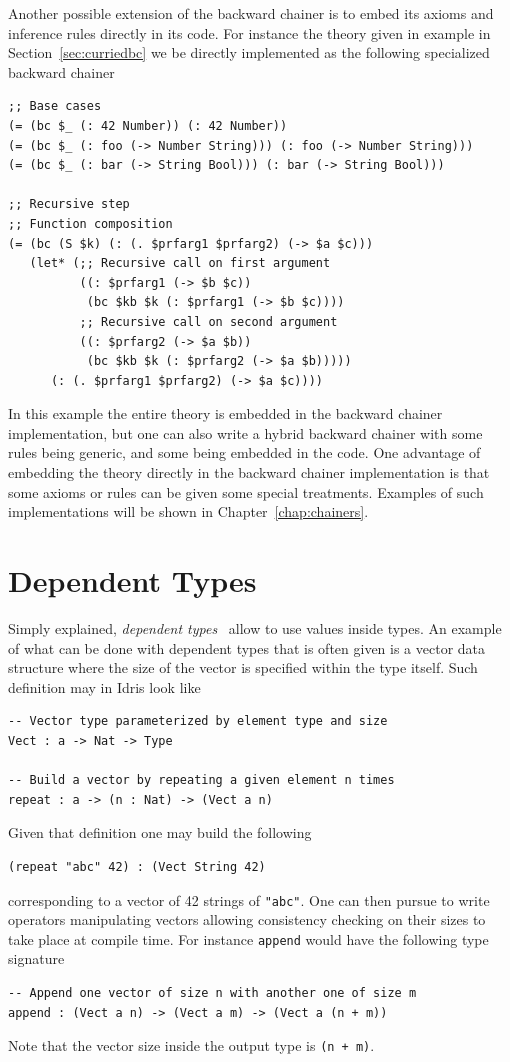 \documentclass[]{report}
\begin{document}
Another possible extension of the backward chainer is to embed its
axioms and inference rules directly in its code.  For instance the
theory given in example in Section~\ref{sec:curriedbc} we be directly
implemented as the following specialized backward chainer

\begin{verbatim}
;; Base cases
(= (bc $_ (: 42 Number)) (: 42 Number))
(= (bc $_ (: foo (-> Number String))) (: foo (-> Number String)))
(= (bc $_ (: bar (-> String Bool))) (: bar (-> String Bool)))

;; Recursive step
;; Function composition
(= (bc (S $k) (: (. $prfarg1 $prfarg2) (-> $a $c)))
   (let* (;; Recursive call on first argument
          ((: $prfarg1 (-> $b $c))
           (bc $kb $k (: $prfarg1 (-> $b $c))))
          ;; Recursive call on second argument
          ((: $prfarg2 (-> $a $b))
           (bc $kb $k (: $prfarg2 (-> $a $b)))))
      (: (. $prfarg1 $prfarg2) (-> $a $c))))
\end{verbatim}
In this example the entire theory is embedded in the backward chainer
implementation, but one can also write a hybrid backward chainer with
some rules being generic, and some being embedded in the code.  One
advantage of embedding the theory directly in the backward chainer
implementation is that some axioms or rules can be given some special
treatments.  Examples of such implementations will be shown in
Chapter~\ref{chap:chainers}.

\section{Dependent Types}

Simply explained, \emph{dependent types}~\cite{TODO} allow to use
values inside types.  An example of what can be done with dependent
types that is often given is a vector data structure where the size of
the vector is specified within the type itself.  Such definition may
in Idris look like
\begin{verbatim}
-- Vector type parameterized by element type and size
Vect : a -> Nat -> Type

-- Build a vector by repeating a given element n times
repeat : a -> (n : Nat) -> (Vect a n)
\end{verbatim}
Given that definition one may build the following
\begin{verbatim}
(repeat "abc" 42) : (Vect String 42)
\end{verbatim}
corresponding to a vector of 42 strings of \texttt{"abc"}.
One can then pursue to write operators manipulating vectors allowing
consistency checking on their sizes to take place at compile time.
For instance \texttt{append} would have the following type
signature
\begin{verbatim}
-- Append one vector of size n with another one of size m
append : (Vect a n) -> (Vect a m) -> (Vect a (n + m))
\end{verbatim}
Note that the vector size inside the output type is
\texttt{(n + m)}.\\
\end{document}

